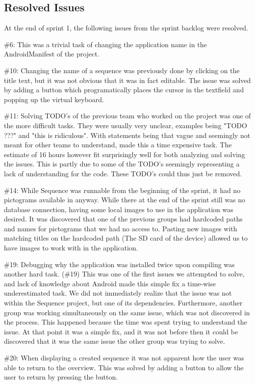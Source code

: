 \subsection{Resolved Issues} \label{subsec:spr1_resolved_issues}

At the end of sprint 1, the following issues from the sprint backlog were resolved.

\#6: This was a trivial task of changing the application name in the AndroidManifest of the project.

\#10: Changing the name of a sequence was previously done by clicking on the title text, but it was not obvious that it was in fact editable. The issue was solved by adding a button which programatically places the cursor in the textfield and popping up the virtual keyboard.

\#11: Solving TODO's of the previous team who worked on the project was one of the more difficult tasks. They were usually very unclear, examples being "TODO ???" and "this is ridiculous". With statements being that vague and seemingly not meant for other teams to understand, made this a time expensive task. The estimate of 16 hours however fit surprisingly well for both analyzing and solving the issues. This is partly due to some of the TODO's seemingly representing a lack of understanding for the code. These TODO's could thus just be removed.

\#14: While Sequence was runnable from the beginning of the sprint, it had no pictograms available in anyway. While there at the end of the sprint still was no database connection, having some local images to use in the application was desired. It was discovered that one of the previous groups had hardcoded paths and names for pictograms that we had no access to. Pasting new images with matching titles on the hardcoded path (The SD card of the device) allowed us to have images to work with in the application.

\#19: Debugging why the application was installed twice upon compiling was another hard task. (\#19) This was one of the first issues we attempted to solve, and lack of knowledge about Android made this simple fix a time-wise underestimated task. We did not immediately realize that the issue was not within the Sequence project, but one of its dependencies. Furthermore, another group was working simultaneously on the same issue, which was not discovered in the process. This happened because the time was spent trying to understand the issue. At that point it was a simple fix, and it was not before then it could be discovered that it was the same issue the other group was trying to solve.

\#20: When displaying a created sequence it was not apparent how the user was able to return to the overview. This was solved by adding a button to allow the user to return by pressing the button.